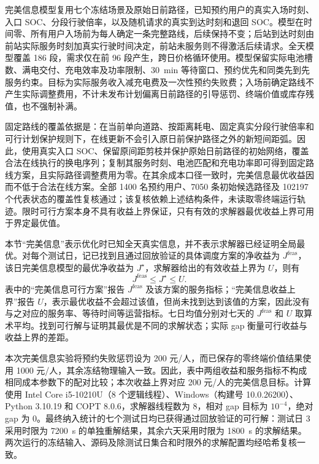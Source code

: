 完美信息模型复用七个冻结场景及原始日前路径，已知预约用户的真实入场时刻、入口 SOC、分段行驶倍率，以及随机请求的真实到达时刻和退回 SOC。模型在时间零、所有用户入场前为每人确定一条完整路线，后续保持不变；后站到达时刻由前站实际服务时刻加真实行驶时间决定，前站未服务则不得激活后续请求。全天模型覆盖 186 段，需求仅在前 96 段产生，跨日价格循环使用。模型保留实际电池槽数、满电交付、充电效率及功率限制、30~min 等待窗口、预约优先和同类先到先服务约束。目标为实际服务收入减充电费及一次性预约失败费；入场前确定路线不产生实际调整费用，不计未发布计划偏离日前路径的引导惩罚、终端价值或库存残值，也不强制补满。

固定路线的覆盖依据是：在当前单向道路、按距离耗电、固定真实分段行驶倍率和可行计划保护规则下，在线更新不会引入原日前保护路径之外的新短间距弧。因此，使用真实入口 SOC、保留原间距剪枝并保护原始日前路径的初始网络，覆盖合法在线执行的换电序列；复制其服务时刻、电池匹配和充电功率即可得到固定路线方案，且实际路径调整费用为零。在其余成本口径一致时，完美信息最优收益因而不低于合法在线方案。全部 1400 名预约用户、7050 条初始候选路径及 102197 个代表状态的覆盖性复核通过；该复核依赖上述结构条件，未读取零终端运行轨迹。限时可行方案本身不具有收益上界保证，只有有效的求解器最优收益上界可用于界定最优值。

本节“完美信息”表示优化时已知全天真实信息，并不表示求解器已经证明全局最优。对每个测试日，记已找到且通过回放验证的具体调度方案的净收益为 $J^{\mathrm{feas}}$，该日完美信息模型的最优净收益为 $J^\star$，求解器给出的有效收益上界为 $U$，则有
\begin{equation}
  J^{\mathrm{feas}} \le J^\star \le U.
  \label{eq:perfect_information_bounds}
\end{equation}
表中的“完美信息可行方案”报告 $J^{\mathrm{feas}}$ 及该方案的服务指标；“完美信息收益上界”报告 $U$，表示最优收益不会超过该值，但尚未找到达到该值的方案，因此没有与之对应的服务率、等待时间等运营指标。七日均值分别对七天的 $J^{\mathrm{feas}}$ 和 $U$ 取算术平均。找到可行解与证明其最优是不同的求解状态；实际 gap 衡量可行收益与收益上界的差距。

本次完美信息实验将预约失败惩罚设为 200 元/人，而已保存的零终端价值结果使用 1000 元/人，其余冻结物理输入一致。因此，表中两组收益和服务指标不构成相同成本参数下的配对比较；本次收益上界对应 200 元/人的完美信息目标。计算使用 Intel Core i5-10210U（8 个逻辑线程）、Windows（构建号 10.0.26200）、Python 3.10.19 和 COPT 8.0.6，求解器线程数为 8，相对 gap 目标为 $10^{-4}$，绝对 gap 为 0。最终纳入统计的七个测试日均已获得通过回放验证的可行解：测试日 3 采用时限为 7200~s 的单独重解结果，其余六天采用时限为 1800~s 的求解结果。两次运行的冻结输入、源码及除测试日集合和时限外的求解配置均经哈希复核一致。

